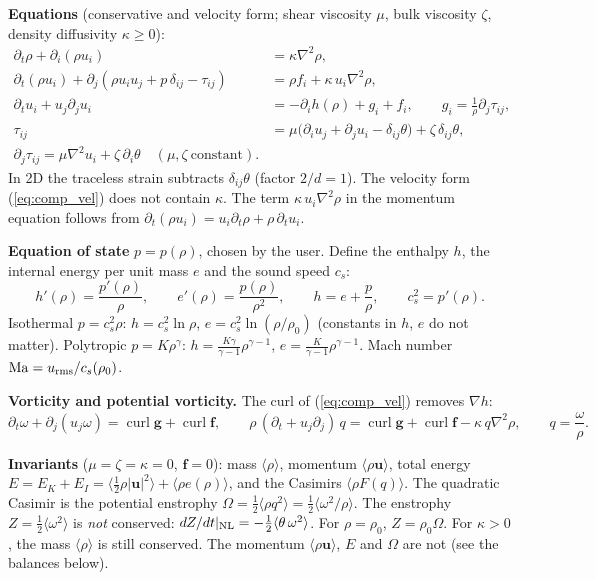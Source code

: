 \documentclass[11pt]{article}
\newcommand{\avg}[1]{\langle #1\rangle}
\newcommand{\curl}{\operatorname{curl}}
\begin{document}
\textbf{Equations} (conservative and velocity form; shear viscosity $\mu$, bulk viscosity $\zeta$, density diffusivity $\kappa\ge0$):
\begin{align}
\partial_t\rho+\partial_i(\rho u_i)&=\kappa\nabla^2\rho,\\
\partial_t(\rho u_i)+\partial_j(\rho u_iu_j+p\,\delta_{ij}-\tau_{ij})&=\rho f_i+\kappa\,u_i\nabla^2\rho,\\
\partial_tu_i+u_j\partial_ju_i&=-\partial_ih(\rho)+g_i+f_i,\qquad g_i=\frac{1}{\rho}\partial_j\tau_{ij},\label{eq:comp_vel}\\
\tau_{ij}&=\mu\big(\partial_iu_j+\partial_ju_i-\delta_{ij}\theta\big)+\zeta\,\delta_{ij}\theta,\\
\partial_j\tau_{ij}=\mu\nabla^2u_i+\zeta\,\partial_i\theta\quad(\mu,\zeta\ \text{constant}).
\end{align}
In 2D the traceless strain subtracts $\delta_{ij}\theta$ (factor $2/d=1$).
The velocity form (\ref{eq:comp_vel}) does not contain $\kappa$. The term $\kappa\,u_i\nabla^2\rho$ in the momentum equation follows from $\partial_t(\rho u_i)=u_i\partial_t\rho+\rho\,\partial_tu_i$.

\textbf{Equation of state} $p=p(\rho)$, chosen by the user. Define the enthalpy $h$, the internal energy per unit mass $e$ and the sound speed $c_s$:
\begin{equation}
h'(\rho)=\frac{p'(\rho)}{\rho},\qquad e'(\rho)=\frac{p(\rho)}{\rho^2},\qquad h=e+\frac p\rho,\qquad c_s^2=p'(\rho).
\end{equation}
Isothermal $p=c_s^2\rho$: $h=c_s^2\ln\rho$, $e=c_s^2\ln(\rho/\rho_0)$ (constants in $h$, $e$ do not matter).
Polytropic $p=K\rho^\gamma$: $h=\frac{K\gamma}{\gamma-1}\rho^{\gamma-1}$, $e=\frac{K}{\gamma-1}\rho^{\gamma-1}$.
Mach number $\mathrm{Ma}=u_{\rm rms}/c_s(\rho_0)$.

\textbf{Vorticity and potential vorticity.} The curl of (\ref{eq:comp_vel}) removes $\nabla h$:
\begin{equation}
\partial_t\omega+\partial_j(u_j\omega)=\curl\bm g+\curl\bm f,\qquad
\rho\,(\partial_t+u_j\partial_j)\,q=\curl\bm g+\curl\bm f-\kappa\,q\nabla^2\rho,\qquad q=\frac{\omega}{\rho}.
\end{equation}

\textbf{Invariants} ($\mu=\zeta=\kappa=0$, $\bm f=0$): mass $\avg\rho$, momentum $\avg{\rho\bm u}$, total energy
$E=E_K+E_I=\avg{\tfrac12\rho|\bm u|^2}+\avg{\rho e(\rho)}$, and the Casimirs $\avg{\rho F(q)}$.
The quadratic Casimir is the potential enstrophy $\Omega=\tfrac12\avg{\rho q^2}=\tfrac12\avg{\omega^2/\rho}$.
The enstrophy $Z=\tfrac12\avg{\omega^2}$ is \emph{not} conserved: $dZ/dt|_{\rm NL}=-\tfrac12\avg{\theta\,\omega^2}$.
For $\rho=\rho_0$, $Z=\rho_0\Omega$.
For $\kappa>0$, the mass $\avg\rho$ is still conserved. The momentum $\avg{\rho\bm u}$, $E$ and $\Omega$ are not (see the balances below).
\end{document}
